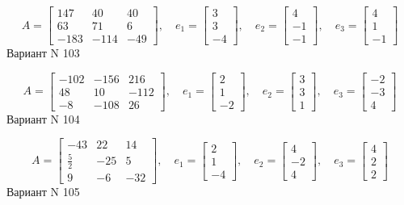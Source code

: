 \documentclass[11pt]{report}
\begin{document}
$$A = \left[\begin{matrix}147 & 40 & 40\\63 & 71 & 6\\-183 & -114 & -49\end{matrix}\right],\quad e_1 = \left[\begin{matrix}3\\3\\-4\end{matrix}\right],\quad e_2 = \left[\begin{matrix}4\\-1\\-1\end{matrix}\right],\quad e_3 = \left[\begin{matrix}4\\1\\-1\end{matrix}\right]$$Вариант N 103

$$A = \left[\begin{matrix}-102 & -156 & 216\\48 & 10 & -112\\-8 & -108 & 26\end{matrix}\right],\quad e_1 = \left[\begin{matrix}2\\1\\-2\end{matrix}\right],\quad e_2 = \left[\begin{matrix}3\\3\\1\end{matrix}\right],\quad e_3 = \left[\begin{matrix}-2\\-3\\4\end{matrix}\right]$$Вариант N 104

$$A = \left[\begin{matrix}-43 & 22 & 14\\\frac{5}{2} & -25 & 5\\9 & -6 & -32\end{matrix}\right],\quad e_1 = \left[\begin{matrix}2\\1\\-4\end{matrix}\right],\quad e_2 = \left[\begin{matrix}4\\-2\\4\end{matrix}\right],\quad e_3 = \left[\begin{matrix}4\\2\\2\end{matrix}\right]$$Вариант N 105
\end{document}
